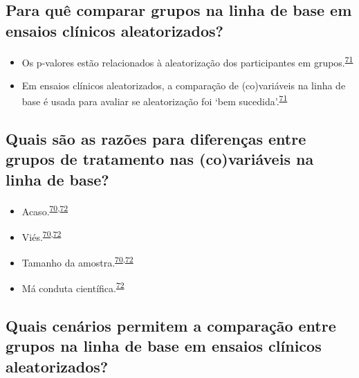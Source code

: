 \documentclass[
]{book}
\begin{document}
\hypertarget{para-quuxea-comparar-grupos-na-linha-de-base-em-ensaios-cluxednicos-aleatorizados}{%
\subsection{Para quê comparar grupos na linha de base em ensaios clínicos aleatorizados?}\label{para-quuxea-comparar-grupos-na-linha-de-base-em-ensaios-cluxednicos-aleatorizados}}

\begin{itemize}
\item
  Os p-valores estão relacionados à aleatorização dos participantes em grupos.\textsuperscript{\protect\hyperlink{ref-Bolzern2019}{71}}
\item
  Em ensaios clínicos aleatorizados, a comparação de (co)variáveis na linha de base é usada para avaliar se aleatorização foi `bem sucedida'.\textsuperscript{\protect\hyperlink{ref-Bolzern2019}{71}}
\end{itemize}

\hypertarget{quais-suxe3o-as-razuxf5es-para-diferenuxe7as-entre-grupos-de-tratamento-nas-covariuxe1veis-na-linha-de-base}{%
\subsection{Quais são as razões para diferenças entre grupos de tratamento nas (co)variáveis na linha de base?}\label{quais-suxe3o-as-razuxf5es-para-diferenuxe7as-entre-grupos-de-tratamento-nas-covariuxe1veis-na-linha-de-base}}

\begin{itemize}
\item
  Acaso.\textsuperscript{\protect\hyperlink{ref-Stang2018}{70},\protect\hyperlink{ref-chen2020}{72}}
\item
  Viés.\textsuperscript{\protect\hyperlink{ref-Stang2018}{70},\protect\hyperlink{ref-chen2020}{72}}
\item
  Tamanho da amostra.\textsuperscript{\protect\hyperlink{ref-Stang2018}{70},\protect\hyperlink{ref-chen2020}{72}}
\item
  Má conduta científica.\textsuperscript{\protect\hyperlink{ref-chen2020}{72}}
\end{itemize}

\hypertarget{quais-cenuxe1rios-permitem-a-comparauxe7uxe3o-entre-grupos-na-linha-de-base-em-ensaios-cluxednicos-aleatorizados}{%
\subsection{Quais cenários permitem a comparação entre grupos na linha de base em ensaios clínicos aleatorizados?}\label{quais-cenuxe1rios-permitem-a-comparauxe7uxe3o-entre-grupos-na-linha-de-base-em-ensaios-cluxednicos-aleatorizados}}
\end{document}
